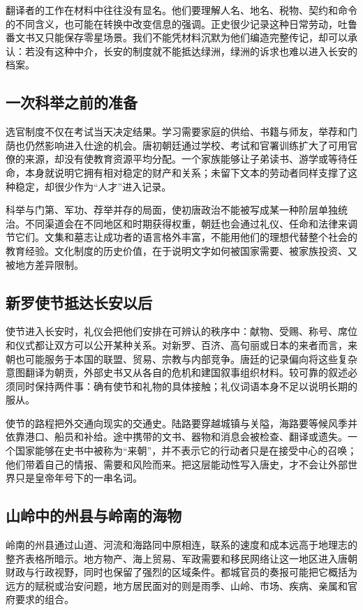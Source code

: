 翻译者的工作在材料中往往没有显名。他们要理解人名、地名、税物、契约和命令的不同含义，也可能在转换中改变信息的强调。正史很少记录这种日常劳动，吐鲁番文书又只能保存零星场景。我们不能凭材料沉默为他们编造完整传记，却可以承认：若没有这种中介，长安的制度就不能抵达绿洲，绿洲的诉求也难以进入长安的档案。

\subsection{一次科举之前的准备}
选官制度不仅在考试当天决定结果。学习需要家庭的供给、书籍与师友，举荐和门荫也仍然影响进入仕途的机会。唐初朝廷通过学校、考试和官署训练扩大了可用官僚的来源，却没有使教育资源平均分配。一个家族能够让子弟读书、游学或等待任命，本身就说明它拥有相对稳定的财产和关系；未留下文本的劳动者同样支撑了这种稳定，却很少作为“人才”进入记录。

科举与门第、军功、荐举并存的局面，使初唐政治不能被写成某一种阶层单独统治。不同渠道会在不同地区和时期获得权重，朝廷也会通过礼仪、任命和法律来调节它们。文集和墓志让成功者的语言格外丰富，不能用他们的理想代替整个社会的教育经验。文化制度的历史价值，在于说明文字如何被国家需要、被家族投资、又被地方差异限制。

\subsection{新罗使节抵达长安以后}
使节进入长安时，礼仪会把他们安排在可辨认的秩序中：献物、受赐、称号、席位和仪式都让双方可以公开某种关系。对新罗、百济、高句丽或日本的来者而言，来朝也可能服务于本国的联盟、贸易、宗教与内部竞争。唐廷的记录偏向将这些复杂意图翻译为朝贡，外部史书又从各自的危机和建国叙事组织材料。较可靠的叙述必须同时保持两件事：确有使节和礼物的具体接触；礼仪词语本身不足以说明长期的服从。

使节的路程把外交通向现实的交通史。陆路要穿越城镇与关隘，海路要等候风季并依靠港口、船员和补给。途中携带的文书、器物和消息会被检查、翻译或遗失。一个国家能够在史书中被称为“来朝”，并不表示它的行动者只是在接受中心的召唤；他们带着自己的情报、需要和风险而来。把这层能动性写入唐史，才不会让外部世界只是皇帝年号下的一串名词。

\subsection{山岭中的州县与岭南的海物}
岭南的州县通过山道、河流和海路同中原相连，联系的速度和成本远高于地理志的整齐表格所暗示。地方物产、海上贸易、军政需要和移民网络让这一地区进入唐朝财政与行政视野，同时也保留了强烈的区域条件。都城官员的奏报可能把它概括为远方的赋税或治安问题，地方居民面对的则是雨季、山岭、市场、疾病、亲属和官府要求的组合。

